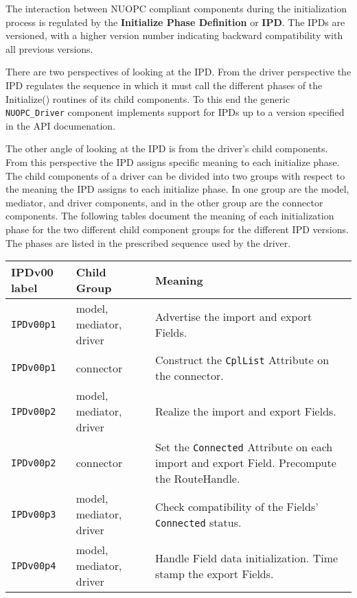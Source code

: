 %

\label{IPD}

The interaction between NUOPC compliant components during the initialization process is regulated by the {\bf Initialize Phase Definition} or {\bf IPD}. The IPDs are versioned, with a higher version number indicating backward compatibility with all previous versions.

There are two perspectives of looking at the IPD. From the driver perspective the IPD regulates the sequence in which it must call the different phases of the Initialize() routines of its child components. To this end the generic {\tt NUOPC\_Driver} component implements support for IPDs up to a version specified in the API documenation.

The other angle of looking at the IPD is from the driver's child components. From this perspective the IPD assigns specific meaning to each initialize phase. The child components of a driver can be divided into two groups with respect to the meaning the IPD assigns to each initialize phase. In one group are the model, mediator, and driver components, and in the other group are the connector components. The following tables document the meaning of each initialization phase for the two different child component groups for the different IPD versions. The phases are listed in the prescribed sequence used by the driver.
\newline

\vspace*{2ex}
\begin{tabular}[h]{|p{35mm}|p{4cm}|p{6cm}|}
     \hline\hline
     {\bf IPDv00 label} & {\bf Child Group} & {\bf Meaning}\\
     \hline\hline
     {\tt IPDv00p1} & model, mediator, driver & Advertise the import and export Fields.\\ \hline
     {\tt IPDv00p1} & connector               & Construct the {\tt CplList} Attribute on the connector.\\ \hline
     {\tt IPDv00p2} & model, mediator, driver & Realize the import and export Fields.\\ \hline
     {\tt IPDv00p2} & connector               & Set the {\tt Connected} Attribute on each import and export Field. Precompute the RouteHandle.\\ \hline
     {\tt IPDv00p3} & model, mediator, driver & Check compatibility of the Fields' {\tt Connected} status.\\ \hline
     {\tt IPDv00p4} & model, mediator, driver & Handle Field data initialization. Time stamp the export Fields.\\
     \hline\hline
\end{tabular}\newline

